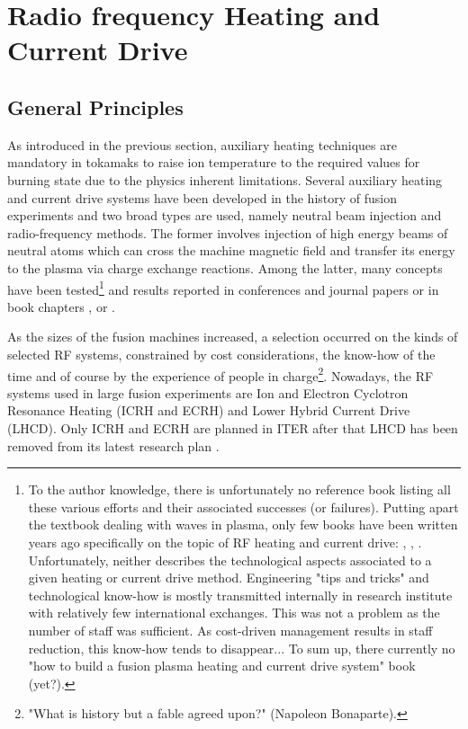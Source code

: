 
\section{Radio frequency Heating and Current Drive}

\subsection{General Principles}
As introduced in the previous section, auxiliary heating techniques are mandatory in tokamaks to raise ion temperature to the required values for burning state due to the physics inherent limitations. Several auxiliary heating and current drive systems have been developed in the history of fusion experiments and two broad types are used, namely neutral beam injection and radio-frequency methods. %
The former involves  injection of high energy beams of neutral atoms which can cross the machine magnetic field and transfer its energy to the plasma via charge exchange reactions. Among the latter, many concepts have been tested\footnote{To the author knowledge, there is unfortunately no reference book listing all these various efforts and their associated successes (or failures). Putting apart the textbook dealing with waves in plasma, only few books have been written years ago specifically on the topic of RF heating and current drive: , , . Unfortunately, neither describes the technological aspects associated to a given heating or current drive method. Engineering "tips and tricks" and technological know-how is mostly transmitted internally in research institute with relatively few international exchanges. This was not a problem as the number of staff was sufficient. As cost-driven management results in staff reduction, this know-how tends to disappear... To sum up, there currently no "how to build a fusion plasma heating and current drive system" book (yet?).} and results reported in conferences and journal papers  or in book chapters \cite[§6]{kikuchi2012}, \cite[§15]{Freidberg2007} or \cite{hillairet2020-1}. 

As the sizes of the fusion machines increased, a selection occurred on the kinds of selected RF systems, constrained by cost considerations, the know-how of the time and of course by the experience of people in charge\footnote{"What is history but a fable agreed upon?" (Napoleon Bonaparte).}. Nowadays, the RF systems used in large fusion experiments are Ion and Electron Cyclotron Resonance Heating (ICRH and ECRH) and Lower Hybrid Current Drive (LHCD). Only ICRH and ECRH are planned in ITER after that LHCD has been removed from its latest research plan \cite{iterorganization2018}. 

